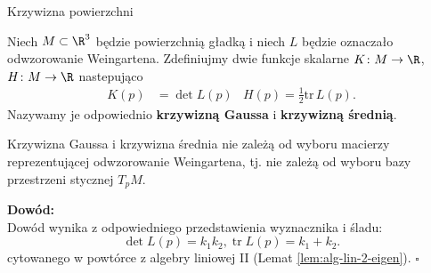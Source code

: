 \begin{frame}{Krzywizna powierzchni}
\pause \begin{definicja}
Niech $M\subset \R^3$ będzie powierzchnią gładką i niech $L$ będzie oznaczało odwzorowanie Weingartena. \pause Zdefiniujmy dwie funkcje skalarne $K\colon M\to \R$, $H\colon M\to \R$ nastepująco
\begin{align*}
K(p)&=\det L(p) & H(p)=\frac{1}{2}\text{tr}\, L(p).
\end{align*}
Nazywamy je odpowiednio \textbf{krzywizną Gaussa} i \textbf{krzywizną średnią}.
\end{definicja}

\end{frame}
\begin{frame}

\begin{lemat}
Krzywizna Gaussa i krzywizna średnia nie zależą od wyboru macierzy reprezentującej odwzorowanie Weingartena, tj. nie zależą od wyboru bazy przestrzeni stycznej $T_pM$.
\end{lemat}

\pause \textcolor{ared}{\textbf{Dowód:}}\\
Dowód wynika z odpowiedniego przedstawienia wyznacznika i śladu:
\[\det L(p)=k_1k_2,\operatorname{tr}L(p)=k_1 +k_2 .\]
cytowanego w powtórce z algebry liniowej II (Lemat \ref{lem:alg-lin-2-eigen}). \hfill $\square$

\end{frame}
